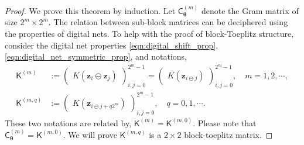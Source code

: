 \documentclass{iitthesis}          %
\newcommand{\bm}[1]{\boldsymbol{#1}}
\newcommand{\vtheta}{{\bm{\theta}}}
\newcommand{\vz}{\bm{z}}
\newcommand{\mC}{\mathsf{C}}
\newcommand{\mK}{\mathsf{K}}
\newcommand{\JRNote}[1]{}
\begin{document}
\begin{proof}
	

We prove this theorem by induction. Let $\mC_{\vtheta}^{(m)}$ denote the Gram matrix of size $2^m \times 2^m$.
The relation between sub-block matrices can be deciphered using the properties of digital nets.
To help with the proof of block-Toeplitz structure, consider the digital net properties \eqref{eqn:digital_shift_prop},  \eqref{eqn:digital_net_symmetric_prop},
and notations,
\begin{align*}
\mK^{(m)} &:= 
\begin{pmatrix}
K({\vz_{i} \ominus \vz_{j}})
\end{pmatrix}_{i,j=0}^{2^{m}-1}
=
\begin{pmatrix}
K({\vz_{i \ominus j}})
\end{pmatrix}_{i,j=0}^{2^{m}-1}, \quad m=1,2,\cdots,
\\
\mK^{(m,q)} &:= 
\begin{pmatrix}
K({\vz_{i \ominus j + q 2^m}})
\end{pmatrix}_{i,j=0}^{2^{m}-1},
\quad 
 q = 0,1,\cdots .
\end{align*} 
These two notations are related by, $\mK^{(m)} = \mK^{(m,0)}$. 
Please note that $\mC_{\vtheta}^{(m)} = \mK^{(m,0)}$.
We will prove $\mK^{(m,q)}$ is a $2\times 2$ block-toeplitz matrix.

\end{proof}
\end{document}

